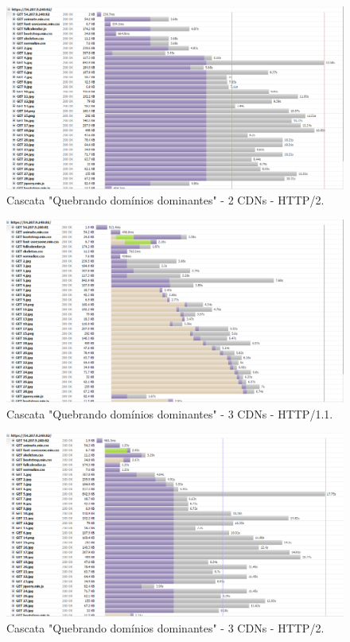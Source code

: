 \begin{figure}[!htb]
    \centering
    \caption{Cascata "Quebrando domínios dominantes" - 2 CDNs - HTTP/2.}
    \includegraphics[width=1.0\textwidth]{./04-figuras/cascatas/2cds_http2}
\end{figure}

\begin{figure}[!htb]
    \centering
    \caption{Cascata "Quebrando domínios dominantes" - 3 CDNs - HTTP/1.1.}
    \includegraphics[width=1.0\textwidth]{./04-figuras/cascatas/3cds_http11}
\end{figure}

\begin{figure}[!htb]
    \centering
    \caption{Cascata "Quebrando domínios dominantes" - 3 CDNs - HTTP/2.}
    \includegraphics[width=1.0\textwidth]{./04-figuras/cascatas/3cds_http2}
\end{figure}

